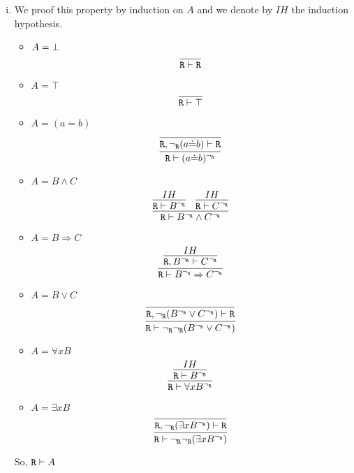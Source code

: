 \begin{enumerate}[(i)]
    \item We proof this property by induction on $A$ and we denote by $IH$ the induction hypothesis.
    \begin{itemize}
        \item $A=\bot$
            $$
                \infer{
                    \R \vdash \R
                }{
                }
            $$
        \item $A=\top$
            $$
                \infer{
                    \R \vdash \top
                }{
                }
            $$
        \item $A=(a\dot{=}b)$
            $$
                \infer{
                    \R \vdash (a\dot{=}b)^\ngr
                }{
                    \infer{
                        \R, \ngr(a\dot{=}b) \vdash \R
                    }{
                    }
                }
            $$
        \item $A=B\wedge C$
            $$
                \infer{
                    \R \vdash B^\ngr \wedge C^\ngr
                }{
                    \infer{
                        \R \vdash B^\ngr
                    }{
                        IH
                    }&
                    \infer{
                        \R \vdash C^\ngr
                    }{
                        IH
                    }
                }
            $$
        \item $A=B \Rightarrow C$
            $$
                \infer{
                    \R \vdash B^\ngr \Rightarrow C^\ngr
                }{
                    \infer{
                        \R, B^\ngr \vdash C^\ngr
                    }{
                        IH
                    }
                }
            $$
        \item $A=B \vee C$
            $$
                \infer{
                    \R \vdash \ngr\ngr(B^\ngr \vee C^\ngr)
                }{
                    \infer{
                        \R, \ngr(B^\ngr \vee C^\ngr) \vdash \R
                    }{
                    }
                }
            $$
        \item $A=\forall x B$
            $$
                \infer{
                    \R \vdash \forall x B^\ngr
                }{
                    \infer{
                        \R \vdash B^\ngr
                    }{
                        IH
                    }
                }
            $$
        \item $A=\exists x B$
            $$
                \infer{
                    \R \vdash \ngr\ngr(\exists x B^\ngr)
                }{
                    \infer{
                        \R, \ngr(\exists x B^\ngr) \vdash \R
                    }{
                    }
                }
            $$
    \end{itemize}
    So, $\texttt{R}\vdash A$
\end{enumerate}